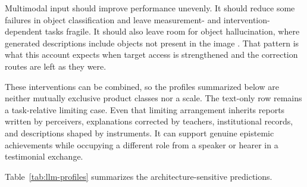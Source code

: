\documentclass[12pt]{article}
\begin{document}
Multimodal input should improve performance unevenly. It should reduce some failures in
object classification and leave measurement- and intervention-dependent tasks fragile.
It should also leave room for object hallucination, where generated descriptions include
objects not present in the image
\citep{li_etal_2023_evaluating_object_hallucination_lvlms}. That pattern is what this
account expects when target access is strengthened and the correction routes are left
as they were.

These interventions can be combined, so the profiles summarized below are neither
mutually exclusive product classes nor a scale. The text-only row remains a
task-relative limiting case. Even that limiting arrangement inherits reports written by perceivers, explanations corrected by
teachers, institutional records, and descriptions shaped by instruments. It can
support genuine epistemic achievements while occupying a different role from a speaker or
hearer in a testimonial exchange.

Table~\ref{tab:llm-profiles} summarizes the architecture-sensitive predictions.
\end{document}
